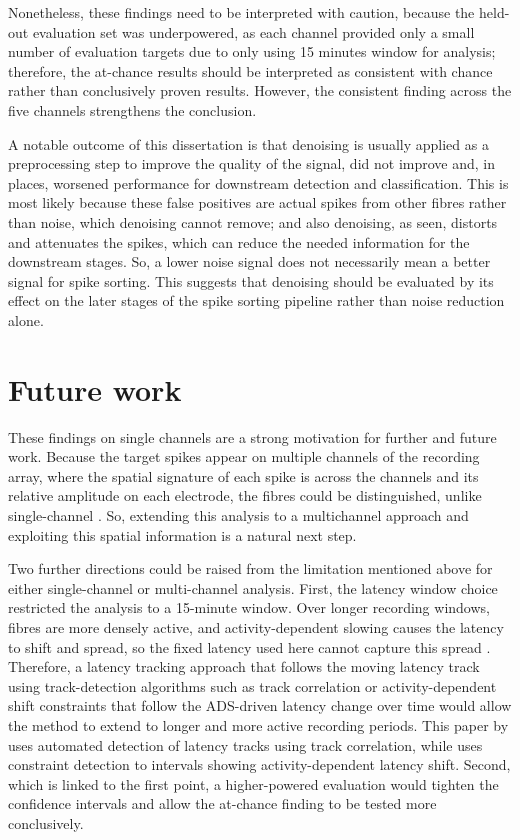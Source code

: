 \documentclass[ %
                    author={Rzan Alkabier},
                    supervisor={Dr. Zahraa Abdallah},
                    degree={MSc},
                     title={Denoising Extracellular Recording for Spike Detection and Classification on Single Channels},
                    subtitle={Does denoising improve detection and classification performance?},
                      type={},
                      year={2026}]{dissertation}
\begin{document}
\noindent
Nonetheless, these findings need to be interpreted with caution, because the held-out evaluation set was underpowered, as each channel provided only a small number of evaluation targets due to only using 15 minutes window for analysis; therefore, the at-chance results should be interpreted as consistent with chance rather than conclusively proven results. However, the consistent finding across the five channels strengthens the conclusion. 
\bigskip

\noindent
A notable outcome of this dissertation is that denoising is usually applied as a preprocessing step to improve the quality of the signal, did not improve and, in places, worsened performance for downstream detection and classification. This is most likely because these false positives are actual spikes from other fibres rather than noise, which denoising cannot remove; and also denoising, as seen, distorts and attenuates the spikes, which can reduce the needed information for the downstream stages. So, a lower noise signal does not necessarily mean a better signal for spike sorting. This suggests that denoising should be evaluated by its effect on the later stages of the spike sorting pipeline rather than noise reduction alone. 
\section{Future work}
These findings on single channels are a strong motivation for further and future work. Because the target spikes appear on multiple channels of the recording array, where the spatial signature of each spike is across the channels and its relative amplitude on each electrode, the fibres could be distinguished, unlike single-channel \cite{harris_accuracy_2000, gray_tetrodes_1995}. So, extending this analysis to a multichannel approach and exploiting this spatial information is a natural next step.  
\bigskip

\noindent
Two further directions could be raised from the limitation mentioned above for either single-channel or multi-channel analysis. First, the latency window choice restricted the analysis to a 15-minute window. Over longer recording windows, fibres are more densely active, and activity-dependent slowing causes the latency to shift and spread, so the fixed latency used here cannot capture this spread \cite{serra_activitydependent_1999}. Therefore, a latency tracking approach that follows the moving latency track using track-detection algorithms such as track correlation or activity-dependent shift constraints that follow the ADS-driven latency change over time would allow the method to extend to longer and more active recording periods. This paper by \cite{turnquist_automated_2016} uses automated detection of latency tracks using track correlation, while \cite{troglio_hybrid_2026} uses constraint detection to intervals showing activity-dependent latency shift. Second, which is linked to the first point, a higher-powered evaluation would tighten the confidence intervals and allow the at-chance finding to be tested more conclusively. 
\bigskip
\end{document}
